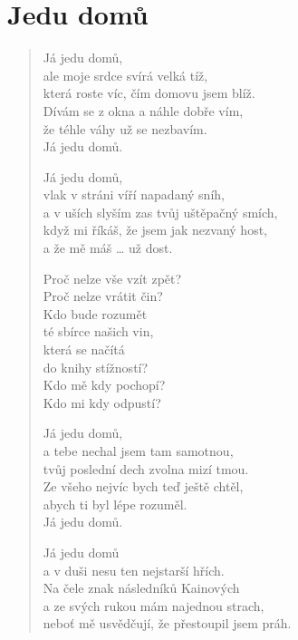 \section{Jedu domů}

\thispagestyle{empty}

\begin{multicols}{2}

\begin{verse}

Já jedu domů,\\
ale moje srdce svírá velká tíž,\\
která roste víc, čím domovu jsem blíž.\\
Dívám se z okna a náhle dobře vím,\\
že téhle váhy už se nezbavím.\\
Já jedu domů.

Já jedu domů,\\
vlak v stráni víří napadaný sníh,\\
a v uších slyším zas tvůj uštěpačný smích,\\
když mi říkáš, že jsem jak nezvaný host,\\
a že mě máš … už dost.

Proč nelze vše vzít zpět?\\
Proč nelze vrátit čin?\\
Kdo bude rozumět\\
té sbírce našich vin,\\
která se načítá\\
do knihy stížností?\\
Kdo mě kdy pochopí?\\
Kdo mi kdy odpustí?

Já jedu domů,\\
a tebe nechal jsem tam samotnou,\\
tvůj poslední dech zvolna mizí tmou.\\
Ze všeho nejvíc bych teď ještě chtěl,\\
abych ti byl lépe rozuměl.\\
Já jedu domů.

\columnbreak

Já jedu domů\\
a v duši nesu ten nejstarší hřích.\\
Na čele znak následníků Kainových\\
a ze svých rukou mám najednou strach,\\
neboť mě usvědčují, že přestoupil jsem práh.


\end{verse}
\end{multicols}

